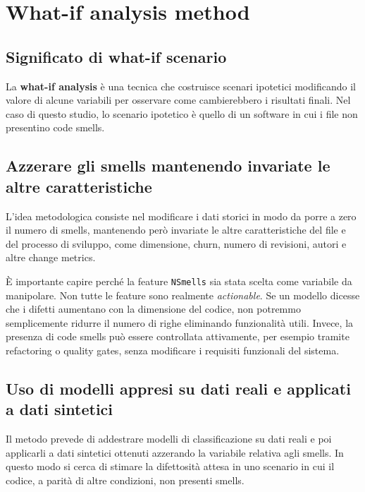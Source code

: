 \section{What-if analysis method}

\subsection{Significato di what-if scenario}

La \textbf{what-if analysis} è una tecnica che costruisce scenari ipotetici modificando il valore di alcune variabili per osservare come cambierebbero i risultati finali. Nel caso di questo studio, lo scenario ipotetico è quello di un software in cui i file non presentino code smells.

\subsection{Azzerare gli smells mantenendo invariate le altre caratteristiche}

L'idea metodologica consiste nel modificare i dati storici in modo da porre a zero il numero di smells, mantenendo però invariate le altre caratteristiche del file e del processo di sviluppo, come dimensione, churn, numero di revisioni, autori e altre change metrics.

\begin{notaprof}
È importante capire perché la feature \texttt{NSmells} sia stata scelta come variabile da manipolare. Non tutte le feature sono realmente \emph{actionable}. Se un modello dicesse che i difetti aumentano con la dimensione del codice, non potremmo semplicemente ridurre il numero di righe eliminando funzionalità utili. Invece, la presenza di code smells può essere controllata attivamente, per esempio tramite refactoring o quality gates, senza modificare i requisiti funzionali del sistema.
\end{notaprof}

\subsection{Uso di modelli appresi su dati reali e applicati a dati sintetici}

Il metodo prevede di addestrare modelli di classificazione su dati reali e poi applicarli a dati sintetici ottenuti azzerando la variabile relativa agli smells. In questo modo si cerca di stimare la difettosità attesa in uno scenario in cui il codice, a parità di altre condizioni, non presenti smells.

